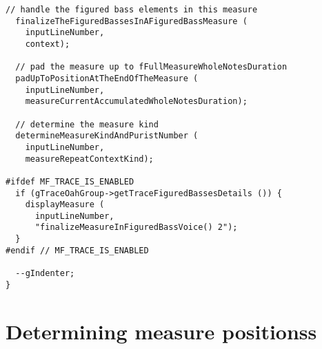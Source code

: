 \begin{lstlisting}[language=CPlusPlus]
  // handle the figured bass elements in this measure
  finalizeTheFiguredBassesInAFiguredBassMeasure (
    inputLineNumber,
    context);

  // pad the measure up to fFullMeasureWholeNotesDuration
  padUpToPositionAtTheEndOfTheMeasure (
    inputLineNumber,
    measureCurrentAccumulatedWholeNotesDuration);

  // determine the measure kind
  determineMeasureKindAndPuristNumber (
    inputLineNumber,
    measureRepeatContextKind);

#ifdef MF_TRACE_IS_ENABLED
  if (gTraceOahGroup->getTraceFiguredBassesDetails ()) {
    displayMeasure (
      inputLineNumber,
      "finalizeMeasureInFiguredBassVoice() 2");
  }
#endif // MF_TRACE_IS_ENABLED

  --gIndenter;
}
\end{lstlisting}


\section{Determining measure positionss}


